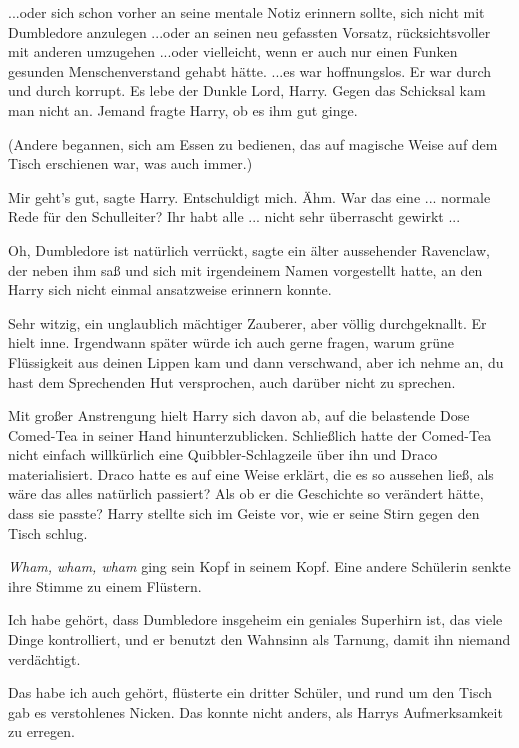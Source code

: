 ...oder sich schon vorher an seine mentale Notiz erinnern sollte, sich nicht mit
Dumbledore anzulegen ...oder an seinen neu gefassten Vorsatz, rücksichtsvoller
mit anderen umzugehen ...oder vielleicht, wenn er auch nur einen Funken gesunden
Menschenverstand gehabt hätte. ...es war hoffnungslos. Er war durch und durch
korrupt. Es lebe der Dunkle Lord, Harry. Gegen das Schicksal kam man nicht an.
Jemand fragte Harry, ob es ihm gut ginge.

(Andere begannen, sich am Essen zu bedienen, das auf magische Weise auf dem
Tisch erschienen war, was auch immer.)

\glqq{}Mir geht's gut\grqq{}, sagte Harry. \glqq{}Entschuldigt mich. Ähm. War
das eine ... normale Rede für den Schulleiter? Ihr habt alle ... nicht sehr
überrascht gewirkt ...\grqq{}

\glqq{}Oh, Dumbledore ist natürlich verrückt\grqq{}, sagte ein älter aussehender
Ravenclaw, der neben ihm saß und sich mit irgendeinem Namen vorgestellt hatte,
an den Harry sich nicht einmal ansatzweise erinnern konnte.

\glqq{}Sehr witzig, ein unglaublich mächtiger Zauberer, aber völlig
durchgeknallt.\grqq{} Er hielt inne. \glqq{}Irgendwann später würde ich auch
gerne fragen, warum grüne Flüssigkeit aus deinen Lippen kam und dann verschwand,
aber ich nehme an, du hast dem Sprechenden Hut versprochen, auch darüber nicht
zu sprechen.\grqq{}

Mit großer Anstrengung hielt Harry sich davon ab, auf die belastende Dose
Comed-Tea in seiner Hand hinunterzublicken. Schließlich hatte der Comed-Tea
nicht einfach willkürlich eine Quibbler-Schlagzeile über ihn und Draco
materialisiert. Draco hatte es auf eine Weise erklärt, die es so aussehen ließ,
als wäre das alles natürlich passiert? Als ob er die Geschichte so verändert
hätte, dass sie passte? Harry stellte sich im Geiste vor, wie er seine Stirn
gegen den Tisch schlug.

\emph{Wham, wham, wham} ging sein Kopf in seinem Kopf. Eine andere Schülerin
senkte ihre Stimme zu einem Flüstern.

\glqq{}Ich habe gehört, dass Dumbledore insgeheim ein geniales Superhirn ist,
das viele Dinge kontrolliert, und er benutzt den Wahnsinn als Tarnung, damit ihn
niemand verdächtigt.\grqq{}

\glqq{}Das habe ich auch gehört\grqq{}, flüsterte ein dritter Schüler, und rund
um den Tisch gab es verstohlenes Nicken. Das konnte nicht anders, als Harrys
Aufmerksamkeit zu erregen.

